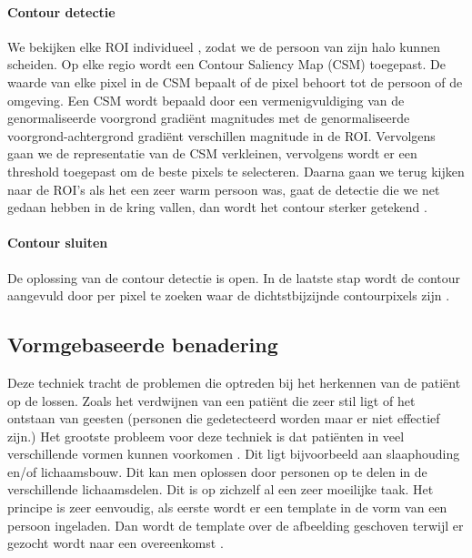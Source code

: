 \paragraph{Contour detectie}
We bekijken elke ROI individueel , zodat we de persoon van zijn halo kunnen scheiden. Op elke regio wordt een Contour Saliency Map (CSM) toegepast. De waarde van elke pixel in de CSM bepaalt of de pixel behoort tot de persoon of de omgeving. Een CSM wordt bepaald door een vermenigvuldiging van de genormaliseerde voorgrond gradi\"ent magnitudes met de genormaliseerde voorgrond-achtergrond gradi\"ent verschillen magnitude in de ROI. Vervolgens gaan we de representatie van de CSM verkleinen, vervolgens wordt er een threshold toegepast om de beste pixels te selecteren. Daarna gaan we terug kijken naar de ROI's als het een zeer warm persoon was, gaat de detectie die we net gedaan hebben in de kring vallen, dan wordt het contour sterker getekend \cite{bibBET5}.

\paragraph{Contour sluiten}
De oplossing van de contour detectie is open. In de laatste stap wordt de contour aangevuld door per pixel te zoeken waar de dichtstbijzijnde contourpixels zijn \cite{bibBET5}.

\subsection{Vormgebaseerde benadering}
\label{refVBB}
Deze techniek tracht de problemen die optreden bij het herkennen van de pati\"ent op de lossen. Zoals het verdwijnen van een pati\"ent die zeer stil ligt of het ontstaan van geesten (personen die gedetecteerd worden maar er niet effectief zijn.) Het grootste probleem voor deze techniek is dat pati\"enten in veel verschillende vormen kunnen voorkomen \cite{bibIRC}. Dit ligt bijvoorbeeld aan slaaphouding en/of lichaamsbouw. Dit kan men oplossen door personen op te delen in de verschillende lichaamsdelen. Dit is op zichzelf al een zeer moeilijke taak.  
Het principe is zeer eenvoudig, als eerste wordt er een template in de vorm van een persoon ingeladen. Dan wordt de template over de afbeelding geschoven terwijl er gezocht wordt naar een overeenkomst \cite{bibIRC4}.